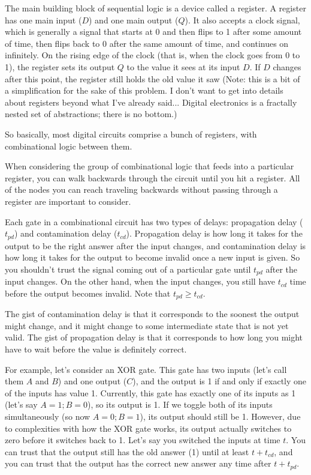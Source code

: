 \documentclass[12pt]{article}
\begin{document}
The main building block of sequential logic is a device called a register. A register has one main input ($D$) and one main output ($Q$). It also accepts a clock signal, which is generally a signal that starts at 0 and then flips to 1 after some amount of time, then flips back to 0 after the same amount of time, and continues on infinitely.
On the rising edge of the clock (that is, when the clock goes from 0 to 1), the register sets its output $Q$ to the value it sees at its input $D$.
If $D$ changes after this point, the register still holds the old value it saw
(Note: this is a bit of a simplification for the sake of this problem. I don't want to get into details about registers beyond what I've already said... Digital electronics is a fractally nested set of abstractions; there is no bottom.)

So basically, most digital circuits comprise a bunch of registers, with combinational logic between them.

When considering the group of combinational logic that feeds into a particular register, you can walk backwards through the circuit until you hit a register. All of the nodes you can reach traveling backwards without passing through a register are important to consider.

Each gate in a combinational circuit has two types of delays: propagation delay ($t_{pd}$) and contamination delay ($t_{cd}$).
Propagation delay is how long it takes for the output to be the right answer after the input changes, and contamination delay is how long it takes for the output to become invalid once a new input is given.
So you shouldn't trust the signal coming out of a particular gate until $t_{pd}$ after the input changes.
On the other hand, when the input changes, you still have $t_{cd}$ time before the output becomes invalid.
Note that $t_{pd} \geq t_{cd}$.

The gist of contamination delay is that it corresponds to the soonest the output might change, and it might change to some intermediate state that is not yet valid.
The gist of propagation delay is that it corresponds to how long you might have to wait before the value is definitely correct.

For example, let's consider an XOR gate. This gate has two inputs (let's call them $A$ and $B$) and one output ($C$), and the output is 1 if and only if exactly one of the inputs has value 1.
Currently, this gate has exactly one of its inputs as 1 (let's say $A = 1; B = 0$), so its output is 1.
If we toggle both of its inputs simultaneously (so now $A = 0; B = 1$), its output should still be 1.
However, due to complexities with how the XOR gate works, its output actually switches to zero before it switches back to 1.
Let's say you switched the inputs at time $t$.
You can trust that the output still has the old answer (1) until at least $t + t_{cd}$, and you can trust that the output has the correct new answer any time after $t + t_{pd}$.
\end{document}
